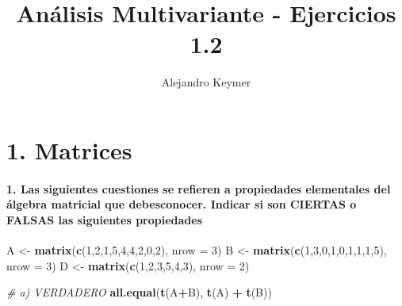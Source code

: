 \documentclass[]{article}
\title{Análisis Multivariante - Ejercicios 1.2}
\author{Alejandro Keymer}
\date{}
\newenvironment{Shaded}{\begin{snugshade}}{\end{snugshade}}
\newcommand{\CommentTok}[1]{\textcolor[rgb]{0.56,0.35,0.01}{\textit{#1}}}
\newcommand{\DataTypeTok}[1]{\textcolor[rgb]{0.13,0.29,0.53}{#1}}
\newcommand{\DecValTok}[1]{\textcolor[rgb]{0.00,0.00,0.81}{#1}}
\newcommand{\KeywordTok}[1]{\textcolor[rgb]{0.13,0.29,0.53}{\textbf{#1}}}
\newcommand{\NormalTok}[1]{#1}
\newcommand{\OperatorTok}[1]{\textcolor[rgb]{0.81,0.36,0.00}{\textbf{#1}}}
\newcommand{\StringTok}[1]{\textcolor[rgb]{0.31,0.60,0.02}{#1}}
\let\oldparagraph\paragraph
\renewcommand{\paragraph}[1]{\oldparagraph{#1}\mbox{}}
\begin{document}
\maketitle

\hypertarget{matrices}{%
\section{1. Matrices}\label{matrices}}

\hypertarget{las-siguientes-cuestiones-se-refieren-a-propiedades-elementales-del-algebra-matricial-que-debesconocer.-indicar-si-son-ciertas-o-falsas-las-siguientes-propiedades}{%
\paragraph{1. Las siguientes cuestiones se refieren a propiedades
elementales del álgebra matricial que debesconocer. Indicar si son
CIERTAS o FALSAS las siguientes
propiedades}\label{las-siguientes-cuestiones-se-refieren-a-propiedades-elementales-del-algebra-matricial-que-debesconocer.-indicar-si-son-ciertas-o-falsas-las-siguientes-propiedades}}

\begin{Shaded}
\begin{Highlighting}[]
\NormalTok{A <-}\StringTok{ }\KeywordTok{matrix}\NormalTok{(}\KeywordTok{c}\NormalTok{(}\DecValTok{1}\NormalTok{,}\DecValTok{2}\NormalTok{,}\DecValTok{1}\NormalTok{,}\DecValTok{5}\NormalTok{,}\DecValTok{4}\NormalTok{,}\DecValTok{4}\NormalTok{,}\DecValTok{2}\NormalTok{,}\DecValTok{0}\NormalTok{,}\DecValTok{2}\NormalTok{), }\DataTypeTok{nrow =} \DecValTok{3}\NormalTok{)}
\NormalTok{B <-}\StringTok{ }\KeywordTok{matrix}\NormalTok{(}\KeywordTok{c}\NormalTok{(}\DecValTok{1}\NormalTok{,}\DecValTok{3}\NormalTok{,}\DecValTok{0}\NormalTok{,}\DecValTok{1}\NormalTok{,}\DecValTok{0}\NormalTok{,}\DecValTok{1}\NormalTok{,}\DecValTok{1}\NormalTok{,}\DecValTok{1}\NormalTok{,}\DecValTok{5}\NormalTok{), }\DataTypeTok{nrow =} \DecValTok{3}\NormalTok{)}
\NormalTok{D <-}\StringTok{ }\KeywordTok{matrix}\NormalTok{(}\KeywordTok{c}\NormalTok{(}\DecValTok{1}\NormalTok{,}\DecValTok{2}\NormalTok{,}\DecValTok{3}\NormalTok{,}\DecValTok{5}\NormalTok{,}\DecValTok{4}\NormalTok{,}\DecValTok{3}\NormalTok{), }\DataTypeTok{nrow =} \DecValTok{2}\NormalTok{)}

\CommentTok{# a) VERDADERO}
\KeywordTok{all.equal}\NormalTok{(}\KeywordTok{t}\NormalTok{(A}\OperatorTok{+}\NormalTok{B), }\KeywordTok{t}\NormalTok{(A) }\OperatorTok{+}\StringTok{ }\KeywordTok{t}\NormalTok{(B))}
\end{Highlighting}
\end{Shaded}
\end{document}

